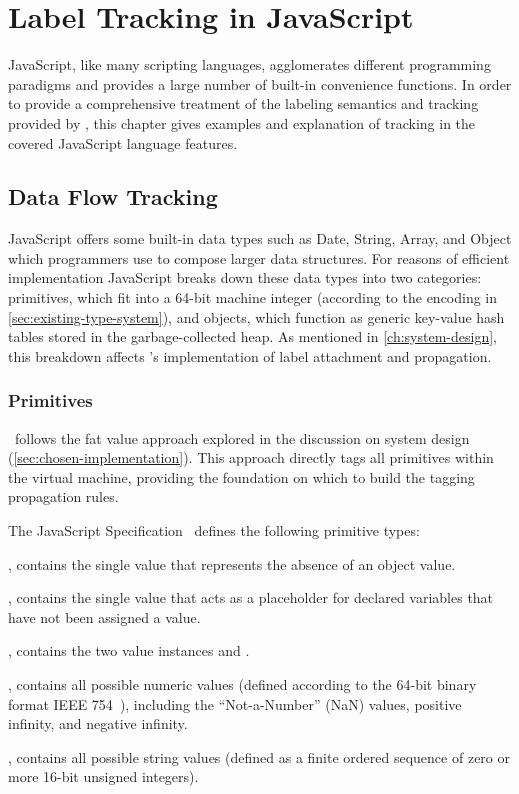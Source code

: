 
\chapter{Label Tracking in JavaScript}
\label{ch:label-tracking}

JavaScript, like many scripting languages, agglomerates different programming paradigms and provides a large number of built-in convenience functions.
In order to provide a comprehensive treatment of the labeling semantics and tracking provided by \FlowCore, this chapter gives examples and explanation of tracking in the covered JavaScript language features.

\section{Data Flow Tracking}
\label{sec:data-flow-tracking}

JavaScript offers some built-in data types such as Date, String, Array, and Object which programmers use to compose larger data structures.
For reasons of efficient implementation JavaScript breaks down these data types into two categories: primitives, which fit into a 64-bit machine integer (according to the encoding in \autoref{sec:existing-type-system}), and objects, which function as generic key-value hash tables stored in the garbage-collected heap.
As mentioned in \autoref{ch:system-design}, this breakdown affects \FlowCore's implementation of label attachment and propagation.

\subsection{Primitives}

\FlowCore\ follows the fat value approach explored in the discussion on system design (\autoref{sec:chosen-implementation}).
This approach directly tags all primitives within the virtual machine, providing the foundation on which to build the tagging propagation rules.

The JavaScript Specification~\cite{ecma} defines the following primitive types:
\begin{description}
  \item \textbf{}, contains the single value  that represents the absence of an object value.
  \item \textbf{}, contains the single value  that acts as a placeholder for declared variables that have not been assigned a value.
  \item \textbf{}, contains the two value instances  and .
  \item \textbf{}, contains all possible numeric values (defined according to the 64-bit binary format IEEE 754~\cite{ieee754}), including the ``Not-a-Number'' (NaN) values, positive infinity, and negative infinity.
  \item \textbf{}, contains all possible string values (defined as a finite ordered sequence of zero or more 16-bit unsigned integers).
\end{description}

